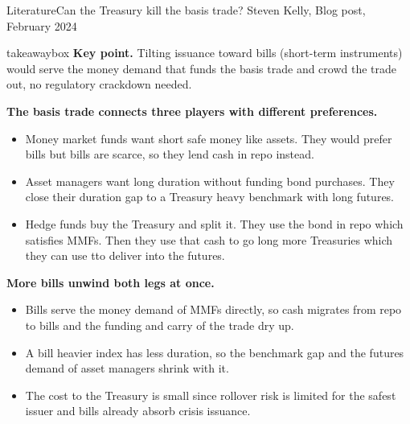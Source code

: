 \documentclass[aspectratio=169,11pt]{beamer}
\newcommand{\keypoint}[1]{%
  \begin{beamercolorbox}[sep=0.6em,wd=\textwidth]{takeawaybox}
    \textbf{Key point.} #1
  \end{beamercolorbox}}
\begin{document}
\begin{frame}{Literature}{Can the Treasury kill the basis trade? Steven Kelly, Blog post, February 2024}
  \footnotesize
  \keypoint{Tilting issuance toward bills (short-term instruments) would serve the money demand that funds the basis trade and crowd the trade out, no regulatory crackdown needed.}
  \medskip
  \textbf{The basis trade connects three players with different preferences.}
  \begin{itemize}
    \item Money market funds want short safe money like assets. They would prefer bills but bills are scarce, so they lend cash in repo instead.
    \item Asset managers want long duration without funding bond purchases. They close their duration gap to a Treasury heavy benchmark with long futures.
    \item Hedge funds buy the Treasury and split it. They use the bond in repo which satisfies MMFs. Then they use that cash to go long more Treasuries which they can use tto deliver into the futures.
  \end{itemize}
  \smallskip
  \textbf{More bills unwind both legs at once.}
  \begin{itemize}
    \item Bills serve the money demand  of MMFs directly, so cash migrates from repo to bills and the funding and carry of the trade dry up.
    \item A bill heavier index has less duration, so the benchmark gap and the futures demand of asset managers shrink with it.
    \item The cost to the Treasury is small since rollover risk is limited for the safest issuer and bills already absorb crisis issuance.
  \end{itemize}
\end{frame}
\end{document}
